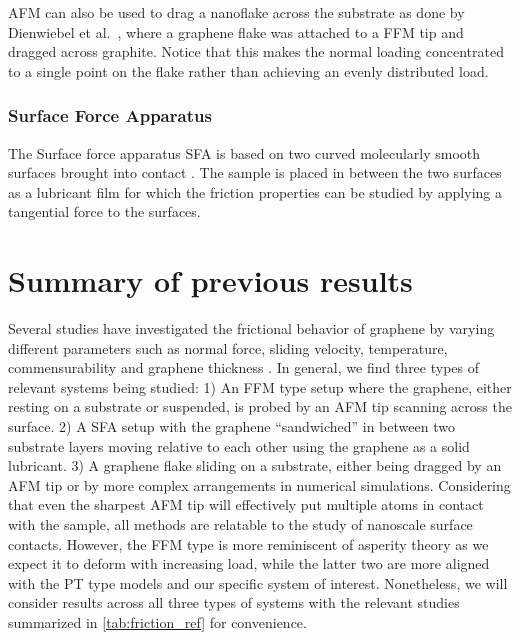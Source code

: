 \acrshort{AFM} can also be used to drag a nanoflake across the substrate as done by
Dienwiebel et al.\ \cite{DIENWIEBEL2005197}, where a graphene flake was attached
to a \acrshort{FFM} tip and dragged across graphite. Notice that this makes the normal
loading concentrated to a single point on the flake rather than achieving an evenly distributed load. 



\subsubsection{Surface Force Apparatus}
The Surface force apparatus \acrshort{SFA} is based on two curved molecularly smooth surfaces brought into contact \cite[p. 188]{gnecco_meyer_2015}. The sample is placed in between the two surfaces as a lubricant film for which the friction properties can be studied by applying a tangential force to the surfaces. 




\section{Summary of previous results}\label{sec:prev_results}
Several studies have investigated the frictional behavior of graphene by varying
different parameters such as normal force, sliding velocity, temperature,
commensurability and graphene thickness \cite{penkov_tribology_2014}. In
general, we find three types of relevant systems being studied: 1) An
\acrshort{FFM} type setup where the graphene, either resting on a substrate or
suspended, is probed by an \acrshort{AFM} tip scanning across the surface. 2) A
\acrshort{SFA} setup with the graphene ``sandwiched'' in between two
substrate layers moving relative to each other using the graphene as a solid
lubricant. 3) A graphene flake sliding on a substrate, either being dragged by
an \acrshort{AFM} tip or by more complex arrangements in numerical simulations.
Considering that even the sharpest \acrshort{AFM} tip will effectively put
multiple atoms in contact with the sample, all methods are relatable to the study of nanoscale surface contacts. However, the \acrshort{FFM} type is more reminiscent of asperity theory as we expect it to deform with increasing load, while the latter two are more aligned with the \acrshort{PT} type models and our specific system of interest. Nonetheless, we will consider results across all three types of systems with the relevant studies summarized in \cref{tab:friction_ref} for convenience. 



